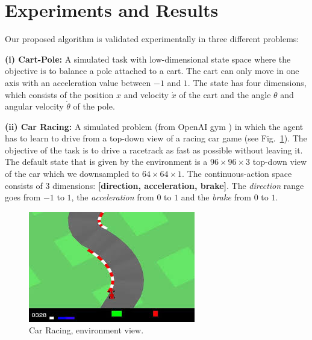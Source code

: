 \section{Experiments and Results}

Our proposed algorithm is validated experimentally in three different problems: 

\textbf{(i) Cart-Pole:} A simulated task with low-dimensional state space where the objective is to balance a pole attached to a cart. The cart can only move in one axis with an acceleration value between $-1$ and $1$. The state has four dimensions, which consists of the position $x$ and velocity $\dot x$ of the cart and the angle $\theta$ and angular velocity $\dot \theta$ of the pole.

\textbf{(ii) Car Racing:} A simulated problem (from OpenAI gym \cite{brockman2016openai}) in which the agent has to learn to drive from a top-down view of a racing car game (see Fig.~\ref{fig:Car_Racing}). The objective of the task is to drive a racetrack as fast as possible without leaving it. The default state that is given by the environment is a $96\times96\times3$ top-down view of the car which we downsampled to $64\times64\times1$. The continuous-action space consists of 3 dimensions: \textbf{[direction, acceleration, brake]}. The \emph{direction} range goes from $-1$ to $1$, the \emph{acceleration} from $0$ to $1$ and the \emph{brake} from $0$ to $1$.

\begin{figure}[h]
    \centering
    \includegraphics[scale=0.8]{imagenes/cap3/car_racing_env.jpg}
    \caption{Car Racing, environment view.}
    \label{fig:Car_Racing}
\end{figure}

